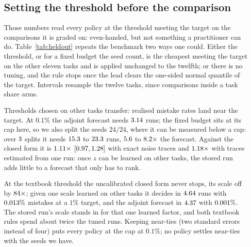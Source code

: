 \subsection{Setting the threshold before the comparison}
\label{sec:heldout}

Those numbers read every policy at the threshold meeting the target on the comparisons it is graded
on: even-handed, but not something a practitioner can do. Table~\ref{tab:heldout} repeats the
benchmark two ways one could. Either the threshold, or for a fixed budget the seed count, is the
cheapest meeting the target on the other eleven tasks and is applied unchanged to the twelfth; or
there is no tuning, and the rule stops once the lead clears the one-sided normal quantile of the
target. Intervals resample the twelve tasks, since comparisons inside a task share arms.

\begin{table}[t]
  \centering
  \resizebox{\columnwidth}{!}{}
  \caption{Runs per comparison and realised mistake rate over $\numHeldLoosePairs$ comparisons with
  no threshold read off the comparisons graded. Upper block: threshold fitted on the other eleven
  tasks. Lower block: the textbook threshold. At $0.1\%$ the fixed budget sits at the $16$-seed
  cap; the last row extrapolates it without one.}
  \label{tab:heldout}
\end{table}

Thresholds chosen on other tasks transfer: realised mistake rates land near the target. At $0.1\%$
the adjoint forecast needs $3.14$ runs; the fixed budget sits at its cap here,
so we also split the seeds $24/24$, where it can be measured below a cap: over $3$
splits it needs $15.3$ to $23.3$ runs, $5.6$ to
$8.2\times$ the forecast. Against the closed
form it is $1.11\times$ $[0.97, 1.28]$
with exact noise traces and $1.18\times$ with traces estimated from one run: once $z$ can be learned on other tasks, the
stored run adds little to a forecast that only has to rank.

At the textbook threshold the uncalibrated closed form never stops, its scale off by
$84\times$; given one scale learned on other tasks it decides in
$4.64$ runs with $0.013\%$ mistakes at a $1\%$
target, and the adjoint forecast in $4.37$ with
$0.001\%$. The stored run's scale stands in for that one learned factor,
and both textbook rules spend about twice the tuned runs. Keeping near-ties (two standard errors
instead of four) puts every policy at the cap at $0.1\%$; no policy settles near-ties with the
seeds we have.

